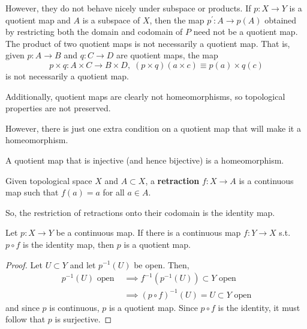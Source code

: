   However, they do not behave nicely under subspace or products. If $p: X \rightarrow Y$ is a quotient map and $A$ is a subspace of $X$, then the map $p^\prime: A \rightarrow p(A)$ obtained by restricting both the domain and codomain of $P$ need not be a quotient map. The product of two quotient maps is not necessarily a quotient map. That is, given $p: A \rightarrow B$ and $q: C \rightarrow D$ are quotient maps, the map 
  \begin{equation}
    p \times q: A \times C \rightarrow B \times D, \; (p \times q) (a \times c) \equiv p(a) \times q(c)
  \end{equation}
  is not necessarily a quotient map. 

  \begin{example}
    
  \end{example}

  \begin{example}
    
  \end{example}

  Additionally, quotient maps are clearly not homeomorphisms, so topological properties are not preserved. 

  \begin{example}[]
    
  \end{example}

  However, there is just one extra condition on a quotient map that will make it a homeomorphism.  

  \begin{lemma}
    A quotient map that is injective (and hence bijective) is a homeomorphism. 
  \end{lemma} 

  \begin{definition}[Retraction]
    Given topological space $X$ and $A \subset X$, a \textbf{retraction} $f: X \to A$ is a continuous map such that $f(a) = a$ for all $a \in A$. 
  \end{definition}

  So, the restriction of retractions onto their codomain is the identity map. 

  \begin{lemma} 
    Let $p: X \to Y$ be a continuous map. If there is a continuous map $f: Y \to X$ s.t. $p \circ f$ is the identity map, then $p$ is a quotient map. 
  \end{lemma}
  \begin{proof}
    Let $U \subset Y$ and let $p^{-1} (U)$ be open. Then, 
    \begin{align}
      p^{-1} (U) \text{ open } & \implies f^{-1} (p^{-1} (U)) \subset Y \text{ open} \\ 
                               & \implies (p \circ f)^{-1}(U) = U \subset Y \text{ open}
    \end{align}
    and since $p$ is continuous, $p$ is a quotient map. Since $p \circ f$ is the identity, it must follow that $p$ is surjective. 
  \end{proof}

